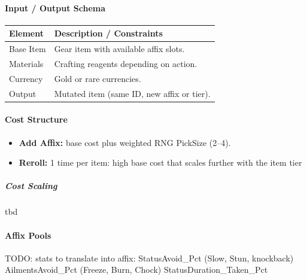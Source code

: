 \paragraph{Input / Output Schema}
\begin{center}
	\begin{tabular}{|l|l|}
		\hline
		\textbf{Element} & \textbf{Description / Constraints} \\ \hline
		Base Item & Gear item with available affix slots. \\
		Materials & Crafting reagents depending on action. \\
		Currency & Gold or rare currencies. \\
		Output & Mutated item (same ID, new affix or tier). \\ \hline
	\end{tabular}
\end{center}

\paragraph{Cost Structure}

\begin{itemize}
	\item \textbf{Add Affix:} base cost plus weighted RNG PickSize (2--4).    
	\item \textbf{Reroll:} 1 time per item: high base cost that scales further with the item tier 
\end{itemize}

\subparagraph{Cost Scaling}

tbd

\paragraph{Affix Pools}

TODO: stats to translate into affix:
StatusAvoid\_Pct (Slow, Stun, knockback)
AilmentsAvoid\_Pct (Freeze, Burn, Chock)
StatusDuration\_Taken\_Pct



